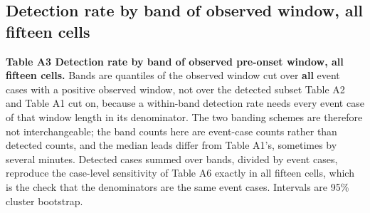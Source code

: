 \vspace{0.8em}

\subsection{Detection rate by band of observed window, all fifteen cells}\label{detection-rate-by-band-of-observed-window-all-fifteen-cells}

\textbf{Table A3 \textbar{} Detection rate by band of observed pre-onset window, all fifteen cells.} Bands are
quantiles of the observed window cut over \textbf{all} event cases with a positive observed window,
not over the detected subset Table A2 and Table A1 cut on, because a within-band detection rate
needs every event case of that window length in its denominator. The two banding schemes are
therefore not interchangeable; the band counts here are event-case counts rather than detected
counts, and the median leads differ from Table A1's, sometimes by several minutes. Detected cases summed over
bands, divided by event cases, reproduce the case-level sensitivity of Table A6 exactly in all fifteen cells, which is the
check that the denominators are the same event cases. Intervals are 95\% cluster bootstrap.

